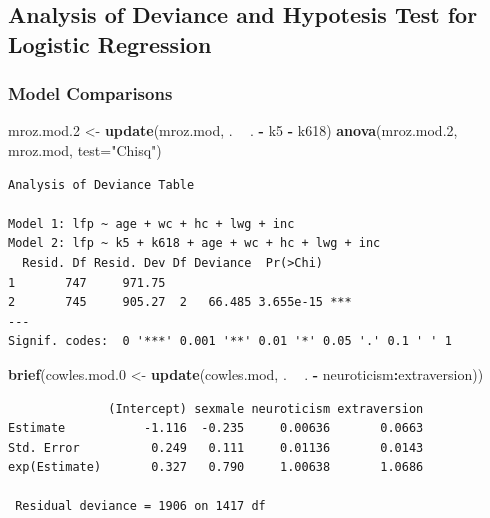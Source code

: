 \documentclass[
]{article}
\newenvironment{Shaded}{\begin{snugshade}}{\end{snugshade}}
\newcommand{\DataTypeTok}[1]{\textcolor[rgb]{0.13,0.29,0.53}{#1}}
\newcommand{\FloatTok}[1]{\textcolor[rgb]{0.00,0.00,0.81}{#1}}
\newcommand{\KeywordTok}[1]{\textcolor[rgb]{0.13,0.29,0.53}{\textbf{#1}}}
\newcommand{\NormalTok}[1]{#1}
\newcommand{\OperatorTok}[1]{\textcolor[rgb]{0.81,0.36,0.00}{\textbf{#1}}}
\newcommand{\StringTok}[1]{\textcolor[rgb]{0.31,0.60,0.02}{#1}}
\begin{document}
\hypertarget{analysis-of-deviance-and-hypotesis-test-for-logistic-regression}{%
\subsection{Analysis of Deviance and Hypotesis Test for Logistic
Regression}\label{analysis-of-deviance-and-hypotesis-test-for-logistic-regression}}

\hypertarget{model-comparisons}{%
\subsubsection{Model Comparisons}\label{model-comparisons}}

\begin{Shaded}
\begin{Highlighting}[]
\NormalTok{mroz.mod}\FloatTok{.2}\NormalTok{ <-}\StringTok{ }\KeywordTok{update}\NormalTok{(mroz.mod, . }\OperatorTok{~}\StringTok{ }\NormalTok{. }\OperatorTok{-}\StringTok{ }\NormalTok{k5 }\OperatorTok{-}\StringTok{ }\NormalTok{k618)}
\KeywordTok{anova}\NormalTok{(mroz.mod}\FloatTok{.2}\NormalTok{, mroz.mod, }\DataTypeTok{test=}\StringTok{"Chisq"}\NormalTok{)}
\end{Highlighting}
\end{Shaded}

\begin{verbatim}
Analysis of Deviance Table

Model 1: lfp ~ age + wc + hc + lwg + inc
Model 2: lfp ~ k5 + k618 + age + wc + hc + lwg + inc
  Resid. Df Resid. Dev Df Deviance  Pr(>Chi)    
1       747     971.75                          
2       745     905.27  2   66.485 3.655e-15 ***
---
Signif. codes:  0 '***' 0.001 '**' 0.01 '*' 0.05 '.' 0.1 ' ' 1
\end{verbatim}

\begin{Shaded}
\begin{Highlighting}[]
\KeywordTok{brief}\NormalTok{(cowles.mod}\FloatTok{.0}\NormalTok{ <-}\StringTok{ }\KeywordTok{update}\NormalTok{(cowles.mod, }
\NormalTok{    . }\OperatorTok{~}\StringTok{ }\NormalTok{. }\OperatorTok{-}\StringTok{ }\NormalTok{neuroticism}\OperatorTok{:}\NormalTok{extraversion))}
\end{Highlighting}
\end{Shaded}

\begin{verbatim}
              (Intercept) sexmale neuroticism extraversion
Estimate           -1.116  -0.235     0.00636       0.0663
Std. Error          0.249   0.111     0.01136       0.0143
exp(Estimate)       0.327   0.790     1.00638       1.0686

 Residual deviance = 1906 on 1417 df
\end{verbatim}
\end{document}
